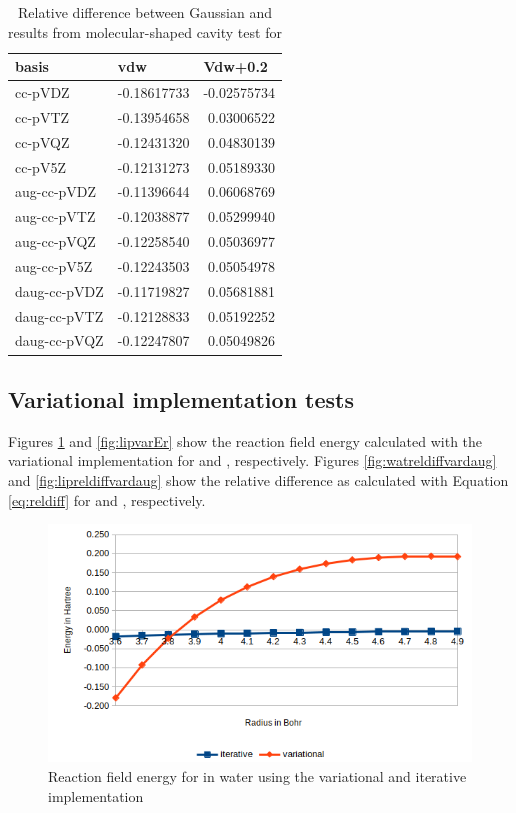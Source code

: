 \documentclass[../master_thesis.tex]{subfiles}
\begin{document}
\begin{table}[htbp]
\caption[Relative difference between Gaussian and \mrchem results for ]{Relative difference between Gaussian and \mrchem results from molecular-shaped cavity  test for }
\begin{tabular}{l|r|r}
basis & \multicolumn{1}{l|}{vdw} & \multicolumn{1}{l|}{Vdw+0.2} \\ \hline
cc-pVDZ & -0.18617733 & -0.02575734 \\
cc-pVTZ & -0.13954658 & 0.03006522 \\
cc-pVQZ & -0.12431320 & 0.04830139 \\
cc-pV5Z & -0.12131273 & 0.05189330 \\ \hline
aug-cc-pVDZ & -0.11396644 & 0.06068769 \\
aug-cc-pVTZ & -0.12038877 & 0.05299940 \\
aug-cc-pVQZ & -0.12258540 & 0.05036977 \\
aug-cc-pV5Z & -0.12243503 & 0.05054978 \\ \hline
daug-cc-pVDZ & -0.11719827 & 0.05681881 \\
daug-cc-pVTZ & -0.12128833 & 0.05192252 \\
daug-cc-pVQZ & -0.12247807 & 0.05049826 \\
\end{tabular}
\label{tab:acetamidabcreldiff}
\end{table}
\clearpage


\subsection{Variational implementation tests}
Figures \ref{fig:watvarEr} and \ref{fig:lipvarEr} show the reaction field energy
calculated with the variational implementation for  and ,
respectively. Figures \ref{fig:watreldiffvardaug} and \ref{fig:lipreldiffvardaug} show the
relative difference as calculated with Equation \ref{eq:reldiff} for  and ,
respectively.

\begin{figure}[!htb]
  \centering
  \includegraphics[width=0.75\linewidth]{img/watvarEr.png}
  \caption{Reaction field energy for  in water using the variational and iterative implementation}
  \label{fig:watvarEr}
\end{figure}
\end{document}

